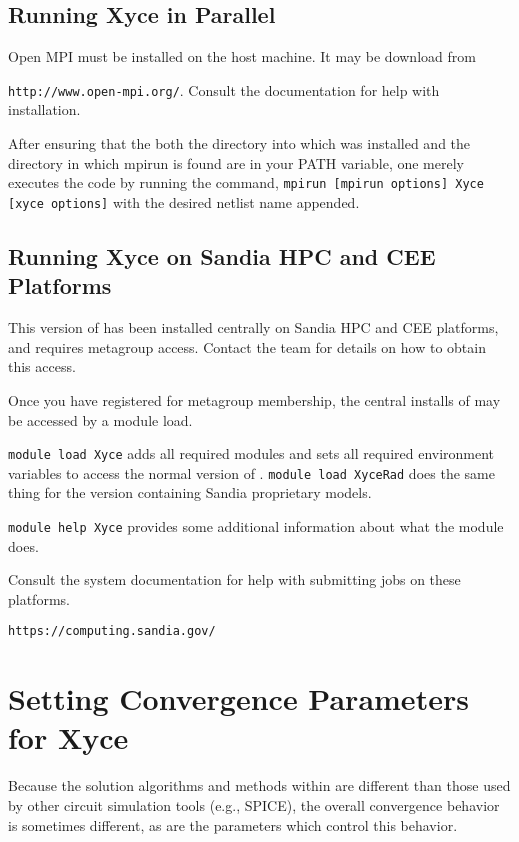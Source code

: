 \section{Running Xyce in Parallel}

Open MPI must be installed on the host machine.  It may be download from 

\texttt{http://www.open-mpi.org/}.  Consult the documentation for help with installation.

After ensuring that the both the directory into which \Xyce{} was
installed and the directory in which mpirun is found are in your PATH
variable, one merely executes the code by running the command,
\texttt{mpirun [mpirun options] Xyce [xyce options]} with the desired
netlist name appended.

\section{Running Xyce on Sandia HPC and CEE Platforms}



This version of \Xyce{} has been installed centrally on Sandia HPC
and CEE platforms, and requires metagroup access.  Contact the \Xyce{} team
for details on how to obtain this access.

Once you have registered for metagroup membership, the central
installs of \Xyce{} may be accessed by a module load.

\verb+module load Xyce+ adds all required modules and sets all
required environment variables to access the normal version of
\Xyce{}.  \verb+module load XyceRad+ does the same thing for the
version \Xyce{} containing Sandia proprietary models.

\verb+module help Xyce+ provides some additional information about
what the module does.

Consult the system documentation for help with submitting jobs on
these platforms.

\verb+https://computing.sandia.gov/+

\chapter{Setting Convergence Parameters for Xyce}
\label{Conv_Guidelines}

Because the solution algorithms and methods within \Xyce{} are different than
those used by other circuit simulation tools (e.g., SPICE), the overall
convergence behavior is sometimes different, as are the parameters which control
this behavior.

